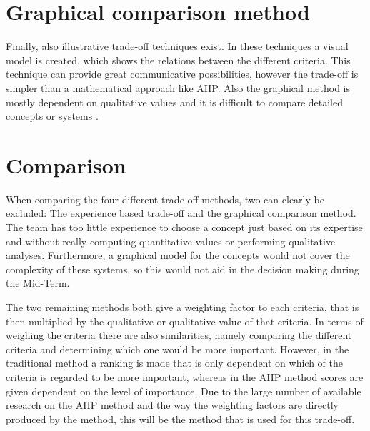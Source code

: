 \section{Graphical comparison method}
\label{graph}
Finally, also illustrative trade-off techniques exist. In these techniques a visual model is created, which shows the relations between the different criteria. This technique can provide great communicative possibilities, however the trade-off is simpler than a mathematical approach like AHP. Also the graphical method is mostly dependent on qualitative values and it is difficult to compare detailed concepts or systems \cite{tradeoff}.

\section{Comparison}
\label{comp}
When comparing the four different trade-off methods, two can clearly be excluded: The experience based trade-off and the graphical comparison method. The team has too little experience to choose a concept just based on its expertise and without really computing quantitative values or performing qualitative analyses. Furthermore, a graphical model for the concepts would not cover the complexity of these systems, so this would not aid in the decision making during the Mid-Term.

The two remaining methods both give a weighting factor to each criteria, that is then multiplied by the qualitative or qualitative value of that criteria. In terms of weighing the criteria there are also similarities, namely comparing the different criteria and determining which one would be more important. However, in the traditional method a ranking is made that is only dependent on which of the criteria is regarded to be more important, whereas in the AHP method scores are given dependent on the level of importance. Due to the large number of available research on the AHP method and the way the weighting factors are directly produced by the method, this will be the method that is used for this trade-off. 




